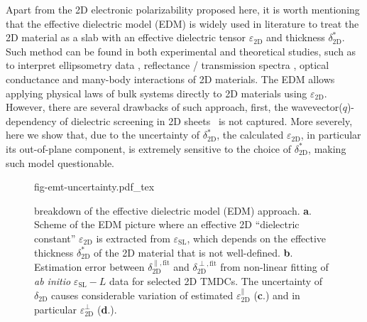 Apart from the 2D electronic polarizability proposed here, it is worth
mentioning that the effective dielectric model (EDM) is widely used in
literature to treat the 2D material as a slab with an effective
dielectric tensor $\varepsilon_{\mathrm{2D}}$ and thickness
$\delta^{*}_{\mathrm{2D}}$. Such method can be found in both
experimental and theoretical studies, such as to interpret
ellipsometry data
\autocite{graphene-epsilon10,Duesberg_2014_opt_MoS2,Chiang13,},
reflectance / transmission spectra
\autocite{Li_2014_opt_ml_mos2,Yoffe-Wilson_1969_TMDC}, optical conductance
\autocite{Matthes_2016_effective_PRB} and many-body interactions
\autocite{Sohier_2016_2D_eps,Markel_2016_EMT} of 2D materials. The EDM
allows applying physical laws of bulk systems directly to 2D materials
using $\varepsilon_{\mathrm{2D}}$. However, there are several
drawbacks of such approach, first, the
wavevector($q$)-dependency of dielectric screening in 2D
sheets~\autocite{Cudazzo_2011_screening_2D,Olsen_2016_hydrogen,Trolle_2017_eps_subst}
is not captured. More severely, here we show that, due to the
uncertainty of $\delta^{*}_{\mathrm{2D}}$, the calculated
$\varepsilon_{\mathrm{2D}}$, in particular its out-of-plane component,
is extremely sensitive to the choice of $\delta^{*}_{\mathrm{2D}}$,
making such model questionable.


\begin{figure}[!htbp]
  \centering
  {fig-emt-uncertainty.pdf_tex}
  \caption{\label{fig-emt} %
    breakdown of the effective dielectric model (EDM)
    approach. \textbf{a}.  Scheme of the EDM picture where an
    effective 2D ``dielectric constant'' $\varepsilon_{\mathrm{2D}}$
    is extracted from $\varepsilon_{\mathrm{SL}}$, which depends on
    the effective thickness $\delta_{\mathrm{2D}}^{*}$ of the 2D
    material that is not well-defined. \textbf{b}.  Estimation error
    between $\delta_{\mathrm{2D}}^{\parallel, \text{fit}}$ and
    $\delta_{\mathrm{2D}}^{\perp, \text{fit}}$ from non-linear fitting
    of \textit{ab initio} $\varepsilon_{\mathrm{SL}} - L$ data for
    selected 2D TMDCs. The uncertainty of $\delta_{\mathrm{2D}}$
    causes considerable variation of estimated
    $\varepsilon_{\mathrm{2D}}^{\parallel}$ (\textbf{c}.) and in
    particular $\varepsilon_{\mathrm{2D}}^{\perp}$ (\textbf{d}.).  }
\end{figure}

